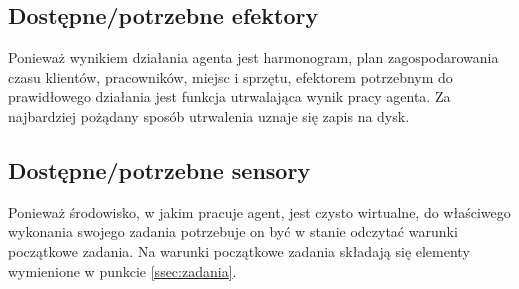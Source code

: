 \subsection{Dostępne/potrzebne efektory}
Ponieważ wynikiem działania agenta jest harmonogram, plan zagospodarowania czasu klientów, pracowników, miejsc i sprzętu, efektorem potrzebnym do prawidłowego działania jest funkcja utrwalająca wynik pracy agenta. Za najbardziej pożądany sposób utrwalenia uznaje się zapis na dysk.

\subsection{Dostępne/potrzebne sensory}
Ponieważ środowisko, w jakim pracuje agent, jest czysto wirtualne, do właściwego wykonania swojego zadania potrzebuje on być w stanie odczytać warunki początkowe zadania. Na warunki początkowe zadania składają się elementy wymienione w punkcie \ref{ssec:zadania}.

